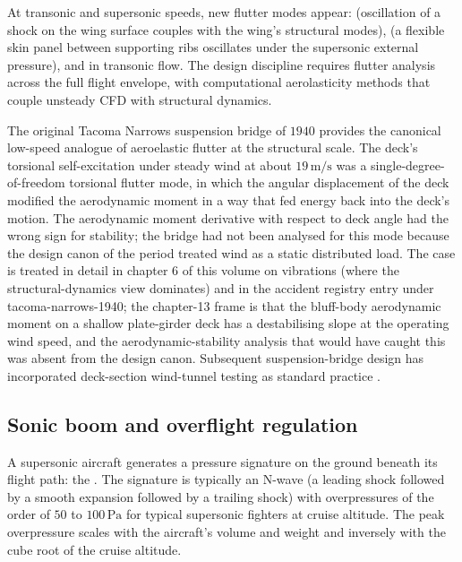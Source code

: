 At transonic and supersonic speeds, new flutter modes appear:
 (oscillation of a shock on the
wing surface couples with the wing's structural modes),
 (a flexible skin panel between supporting
ribs oscillates under the supersonic external pressure), and
 in
transonic flow. The design discipline requires flutter analysis
across the full flight envelope, with computational
aerolasticity methods that couple unsteady CFD with structural
dynamics.

The original Tacoma Narrows suspension bridge of $1940$
\cite{acc:tacoma-narrows-1941} provides the canonical low-speed
analogue of aeroelastic flutter at the structural scale. The
deck's torsional self-excitation under steady wind at about
$19\,\si{\meter\per\second}$ was a single-degree-of-freedom
torsional flutter mode, in which the angular displacement of the
deck modified the aerodynamic moment in a way that fed energy
back into the deck's motion. The aerodynamic moment derivative
with respect to deck angle had the wrong sign for stability; the
bridge had not been analysed for this mode because the design
canon of the period treated wind as a static distributed load.
The case is treated in detail in chapter 6 of this volume on
vibrations (where the structural-dynamics view dominates) and in
the accident registry entry under tacoma-narrows-1940; the
chapter-13 frame is that the bluff-body aerodynamic moment on a
shallow plate-girder deck has a destabilising slope at the
operating wind speed, and the aerodynamic-stability analysis
that would have caught this was absent from the design canon.
Subsequent suspension-bridge design has incorporated
deck-section wind-tunnel testing as standard practice
\cite{acc:tacoma-narrows-1941}.

\subsection{Sonic boom and overflight regulation}

A supersonic aircraft generates a pressure signature on the ground
beneath its flight path: the . The signature
is typically an N-wave (a leading shock followed by a smooth
expansion followed by a trailing shock) with overpressures of
the order of $50$ to $100\,\text{Pa}$ for typical supersonic
fighters at cruise altitude. The peak overpressure scales with
the aircraft's volume and weight and inversely with the cube root
of the cruise altitude.

